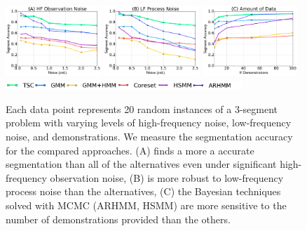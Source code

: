 \begin{figure}[ht!]
\centering
\includegraphics[width=0.32\textwidth]{tsc-experiments/exp1.png}
\includegraphics[width=0.32\textwidth]{tsc-experiments/exp2.png}
\includegraphics[width=0.32\textwidth]{tsc-experiments/exp5.png}
\includegraphics[width=0.8\textwidth]{tsc-experiments/big-legend.png}
\caption{Each data point represents 20 random instances of a 3-segment problem with varying levels of high-frequency noise, low-frequency noise, and demonstrations. We measure the segmentation accuracy for the compared approaches. (A) \tsc finds a more a accurate segmentation than all of the alternatives even under significant high-frequency observation noise, (B) \tsc is more robust to low-frequency process noise than the alternatives, 
(C) the Bayesian techniques solved with MCMC (ARHMM, HSMM) are more sensitive to the number of demonstrations provided than the others.
\label{exp1}}
\end{figure}

